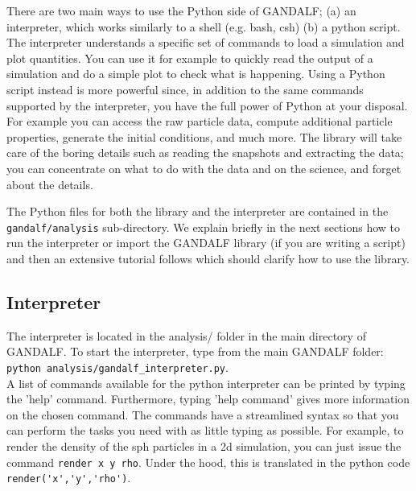 \documentclass[a4paper]{article}
\newcommand{\var}[1]{\texttt{#1}}
\begin{document}
There are two main ways to use the Python side of GANDALF; (a) an interpreter, which works similarly to a shell (e.g. bash, csh) (b) a python script.  The interpreter understands a specific set of commands to load a simulation and plot quantities. You can use it for example to quickly read the output of a simulation and do a simple plot to check what is happening. Using a Python script instead is more powerful since, in addition to the same commands supported by the interpreter, you have the full power of Python at your disposal. For example you can access the raw particle data, compute additional particle properties, generate the initial conditions, and much more. The library will take care of the boring details such as reading the snapshots and extracting the data; you can concentrate on what to do with the data and on the science, and forget about the details.

The Python files for both the library and the interpreter are contained in the \var{gandalf/analysis} sub-directory. We explain briefly in the next sections how to run the interpreter or import the GANDALF library (if you are writing a script) and then an extensive tutorial follows which should clarify how to use the library.

\subsection{Interpreter}

The interpreter is located in the analysis/ folder in the main directory of GANDALF.
To start the interpreter, type from the main GANDALF folder:\\
\newline
\noindent \var{python analysis/gandalf\_interpreter.py}. \\
\newline
A list of commands available for the python interpreter can be printed by typing the 'help' command.  Furthermore, typing 'help command' gives more information on the chosen command.  The commands have a streamlined syntax so that you can perform the tasks you need with as little typing as possible. For example, to render the density of the sph particles in a 2d simulation, you can just issue the command \var{render x y rho}. Under the hood, this is translated in the python code \lstinline[columns=fixed]{render('x','y','rho')}.


\end{document}
